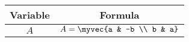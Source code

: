 \begin{center}
    \begin{tabular}{|c|c|} 
        \hline
            \textbf{Variable}  & \textbf{Formula} \\ 
        \hline
            $A$   & $A = \myvec{a & -b \\ b & a}$ \\ 
        \hline
           \end{tabular}
\end{center}  
